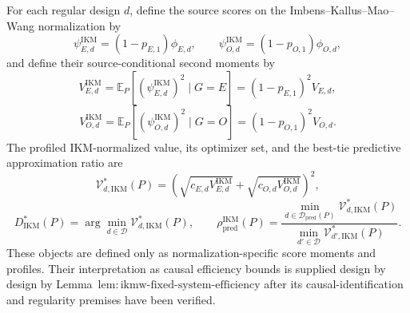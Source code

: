 For each regular design \(d\), define the source scores on the Imbens--Kallus--Mao--Wang normalization by
\[
 \psi_{E,d}^{\mathrm{IKM}}=(1-p_{E,1})\phi_{E,d},
 \qquad
 \psi_{O,d}^{\mathrm{IKM}}=(1-p_{O,1})\phi_{O,d},
\]
and define their source-conditional second moments by
\[
 V_{E,d}^{\mathrm{IKM}}
 =\mathbb E_P[(\psi_{E,d}^{\mathrm{IKM}})^2\mid G=E]
 =(1-p_{E,1})^2V_{E,d},
\]
\[
 V_{O,d}^{\mathrm{IKM}}
 =\mathbb E_P[(\psi_{O,d}^{\mathrm{IKM}})^2\mid G=O]
 =(1-p_{O,1})^2V_{O,d}.
\]
The profiled IKM-normalized value, its optimizer set, and the best-tie predictive approximation ratio are
\[
 \mathcal V_{d,\mathrm{IKM}}^*(P)
 =\left(
 \sqrt{c_{E,d}V_{E,d}^{\mathrm{IKM}}}
 +\sqrt{c_{O,d}V_{O,d}^{\mathrm{IKM}}}
 \right)^2,
\]
\[
 D_{\mathrm{IKM}}^*(P)
 =\arg\min_{d\in\mathcal D}\mathcal V_{d,\mathrm{IKM}}^*(P),
 \qquad
 \rho_{\mathrm{pred}}^{\mathrm{IKM}}(P)
 =\frac{\min_{d\in\mathcal D_{\mathrm{pred}}(P)}
 \mathcal V_{d,\mathrm{IKM}}^*(P)}
 {\min_{d'\in\mathcal D}\mathcal V_{d',\mathrm{IKM}}^*(P)}.
\]
These objects are defined only as normalization-specific score moments and profiles. Their interpretation as causal efficiency bounds is supplied design by design by Lemma~\(\mathrm{lem{:}ikmw\text{-}fixed\text{-}system\text{-}efficiency}\) after its causal-identification and regularity premises have been verified.